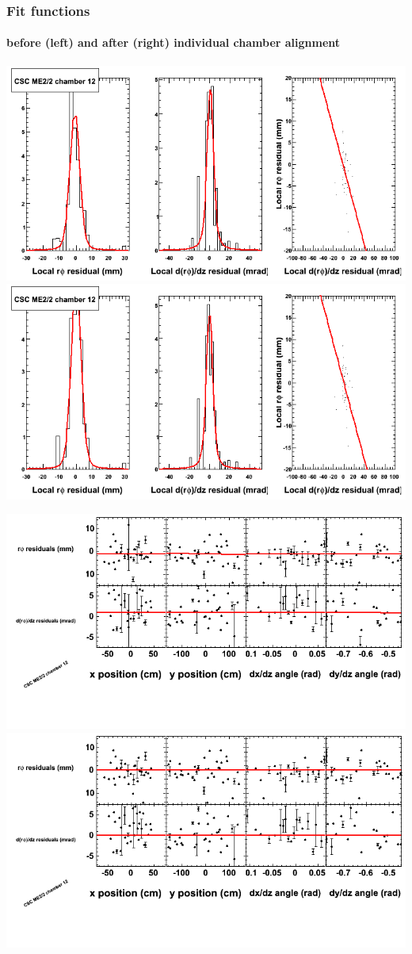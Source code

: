 \documentclass[compress]{beamer}
\begin{document}
\begin{frame}
\frametitle{Fit functions}
\framesubtitle{before (left) and after (right) individual chamber alignment}
\includegraphics[width=0.5\linewidth]{ringfits_3dof/beforefit_MEp22_12_bellcurve.png} \includegraphics[width=0.5\linewidth]{ringfits_3dof/afterfit_MEp22_12_bellcurve.png}

\includegraphics[width=0.5\linewidth]{ringfits_3dof/beforefit_MEp22_12_polynomials.png} \includegraphics[width=0.5\linewidth]{ringfits_3dof/afterfit_MEp22_12_polynomials.png}
\end{frame}
\end{document}
